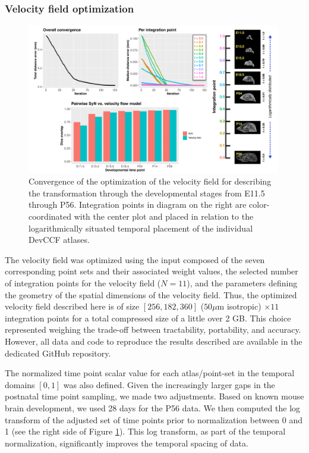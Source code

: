 \documentclass[
  12pt,
]{article}
\begin{document}
\subsubsection{Velocity field
optimization}\label{velocity-field-optimization}

\begin{figure}[!htb]
\centering
\includegraphics[width=0.99\textwidth]{Figures/convergence.pdf}
\caption{Convergence of the optimization of the velocity field for describing
the transformation through the developmental stages from E11.5 through P56.
Integration points in diagram on the right are color-coordinated with the center
plot and placed in relation to the logarithmically situated temporal placement
of the individual DevCCF atlases.}
\label{fig:convergence}
\end{figure}

The velocity field was optimized using the input composed of the seven
corresponding point sets and their associated weight values, the
selected number of integration points for the velocity field (\(N=11\)),
and the parameters defining the geometry of the spatial dimensions of
the velocity field. Thus, the optimized velocity field described here is
of size \([256, 182, 360]\) (\(50 \mu\)m isotropic) \(\times 11\)
integration points for a total compressed size of a little over 2 GB.
This choice represented weighing the trade-off between tractability,
portability, and accuracy. However, all data and code to reproduce the
results described are available in the dedicated GitHub repository.

The normalized time point scalar value for each atlas/point-set in the
temporal domains \([0, 1]\) was also defined. Given the increasingly
larger gaps in the postnatal time point sampling, we made two
adjustments. Based on known mouse brain development, we used 28 days for
the P56 data. We then computed the log transform of the adjusted set of
time points prior to normalization between 0 and 1 (see the right side
of Figure \ref{fig:convergence}). This log transform, as part of the
temporal normalization, significantly improves the temporal spacing of
data.
\end{document}
